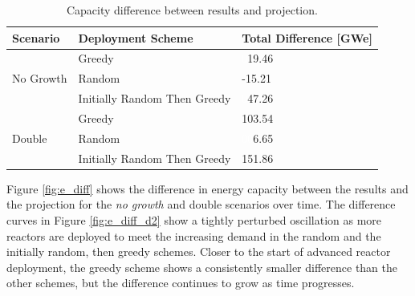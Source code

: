 \begin{table}[H]
    \centering
    \caption{Capacity difference between results and projection.}
    \label{tab:cap_diff}
    \begin{tabular}{l l l}
        \hline
        \textbf{Scenario} & \textbf{Deployment Scheme} & \textbf{Total Difference [GWe]}\\
        \hline
        \multirow{3}{*}{No Growth} & Greedy & \textcolor{white}{0}19.46 \\
        & Random & -15.21 \\
        & Initially Random Then Greedy & \textcolor{white}{0}47.26 \\
        \hline
        \multirow{3}{*}{Double} & Greedy & 103.54 \\
        & Random & \textcolor{white}{00}6.65 \\
        & Initially Random Then Greedy & 151.86 \\
        \hline
    \end{tabular}
\end{table}

Figure \ref{fig:e_diff} shows the difference in energy capacity between the results and the projection for the \textit{no growth} and double scenarios over time. The difference curves in Figure \ref{fig:e_diff_d2} show a tightly perturbed oscillation as more reactors are deployed to meet the increasing demand in the random and the initially random, then greedy schemes. Closer to the start of advanced reactor deployment, the greedy scheme shows a consistently smaller difference than the other schemes, but the difference continues to grow as time progresses.

